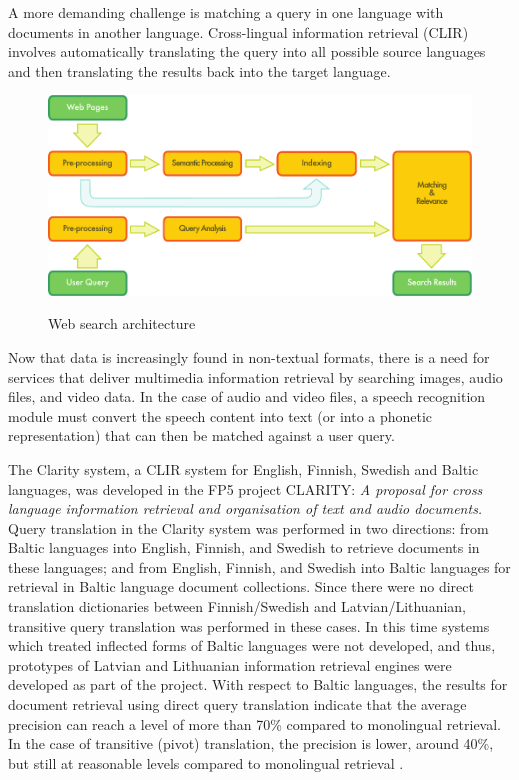 \begin{multicols}{2}
A more demanding challenge is matching a query in one language with documents in another language.
Cross-lingual information retrieval (CLIR) involves automatically translating the query into all possible source languages and then translating the results back into the target language.
\begin{figure}[htb]
  \center
  \includegraphics[width=\textwidth]{../_media/english/web_search_architecture}
  \caption{Web search architecture}
   \label{fig:websearcharch_en}
 \end{figure}
Now that data is increasingly found in non-textual formats, there is a need for services that deliver multimedia information retrieval by searching images, audio files, and video data.
In the case of audio and video files, a speech recognition module must convert the speech content into text (or into a phonetic representation) that can then be matched against a user query.

The Clarity system, a CLIR system for English, Finnish, Swedish and Baltic languages, was developed in the FP5 project CLARITY: \textit{A proposal for cross language information retrieval and organisation of text and audio documents.} Query translation in the Clarity system was performed in two directions: from Baltic languages into English, Finnish, and Swedish to retrieve documents in these languages; and from English, Finnish, and Swedish into Baltic languages for retrieval in Baltic language document collections.
Since there were no direct translation dictionaries between Finnish/Swedish and Latvian/Lithuanian, transitive query translation was performed in these cases.
In this time systems which treated inflected forms of Baltic languages were not developed, and thus, prototypes of Latvian and Lithuanian information retrieval engines were developed as part of the project.
With respect to Baltic languages, the results for document retrieval using direct query translation indicate that the average precision can reach a level of more than 70\% compared to monolingual retrieval.
In the case of transitive (pivot) translation, the precision is lower, around 40\%, but still at reasonable levels compared to monolingual retrieval \cite{meta18}.


\end{multicols}
